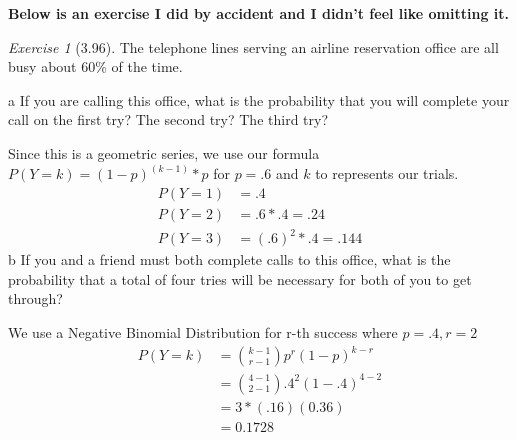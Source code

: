 \documentclass[12pt]{amsart}
\makeatletter
\theoremstyle{remark}
\newtheorem*{exercise}{Exercise}%
\renewenvironment{proof}[1][\proofname]{\par\doublespacing
  \pushQED{\qed}%
  \normalfont \topsep6\p@\@plus6\p@\relax
  \list{}{%
    \settowidth{\leftmargin}{\itshape\proofname:\hskip\labelsep}%
    \setlength{\labelwidth}{0pt}%
    \setlength{\itemindent}{-\leftmargin}%
  }%
  \item[\hskip\labelsep\itshape#1\@addpunct{:}]\ignorespaces
}{%
  \popQED\endlist\@endpefalse
  \singlespacing
}
\theoremstyle{mycomment}
\makeatother
\begin{document}
\textbf{Below is an exercise I did by accident and I didn't feel like omitting it.}

\begin{exercise}[3.96]The telephone lines serving an airline reservation office are all busy about 60\% of the time.
  \newline

  a
If you are calling this office, what is the probability that you will complete your call on the
first try? The second try? The third try?
\begin{proof}[Solution]
  Since this is a geometric series, we use our formula $ P(Y=k) = (1-p)^{(k-1)} * p$ for $p = .6$ and $k$ to represents our trials.
  \begin{align*}
    P(Y=1) &= .4  \\
    P(Y=2) &= .6 * .4 = .24 \\
    P(Y=3) &= (.6)^2 * .4 = .144
  \end{align*}
\end{proof}
b
If you and a friend must both complete calls to this office, what is the probability that a
total of four tries will be necessary for both of you to get through?
\begin{proof}[Solution] We use a Negative Binomial Distribution for r-th success where $p=.4, r = 2$
  \begin{align*}
    P(Y = k) &= {k-1 \choose r-1}p^r(1-p)^{k-r} \\
             &= {4-1 \choose 2-1}.4^2(1-.4)^{4-2} \\
             &= 3*(.16)(0.36) \\
             &= 0.1728
  \end{align*}
\end{proof}
\end{exercise}












 
\end{document}
